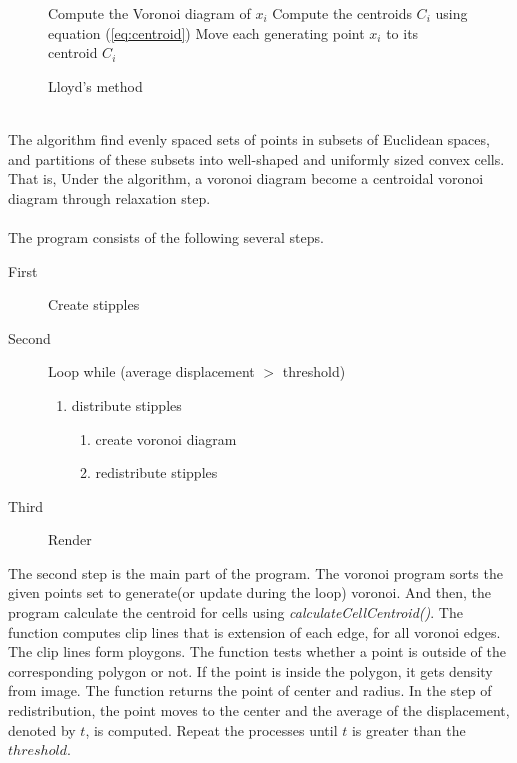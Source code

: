 \documentclass[11pt]{article}
\begin{document}
\begin{figure}[hbt]
\centering
\begin{minipage}{0.7\textwidth}

\begin{algorithm}[H]
\caption{Lloyd's method}
\label{lloydmethod}
\begin{algorithmic}
	\State Compute the Voronoi diagram of $x_i$
	\State Compute the centroids $C_i$ using equation (\ref{eq:centroid})
	\State Move each generating point $x_i$ to its centroid $C_i$
\EndWhile
\end{algorithmic}
\end{algorithm}
\end{minipage}
\end{figure}
\\
The algorithm find evenly spaced sets of points in subsets of Euclidean spaces, and partitions of these subsets into well-shaped and uniformly sized convex cells. That is, Under the algorithm, a voronoi diagram become a centroidal voronoi diagram through relaxation step.
\\ \\
The program consists of the following several steps.
\begin{description}
  \item[First] Create stipples
  \item[Second] Loop while (average displacement $>$ threshold)
	\begin{enumerate}
	  \item distribute stipples
		\begin{enumerate}
	     \item create voronoi diagram
	     \item redistribute stipples
		\end{enumerate}
	\end{enumerate}
  \item[Third] Render
\end{description}

The second step is the main part of the program. The voronoi program sorts the given points set to generate(or update during the loop) voronoi. And then, the program calculate the centroid for cells using \textit{calculateCellCentroid()}. The function computes clip lines that is extension of each edge, for all voronoi edges. The clip lines form ploygons. The function tests whether a point is outside of the corresponding polygon or not. If the point is inside the polygon, it gets density from image. The function returns the point of center and radius. In the step of redistribution, the point moves to the center and the average of the displacement, denoted by $t$, is computed. Repeat the processes until $t$ is greater than the $threshold$. 
\end{document}
